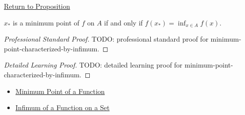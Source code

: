 \newpage
{}
\label{prf:minimum-point-characterized-by-infimum}

\begin{remark*}[Return]
\hyperref[prop:minimum-point-characterized-by-infimum]{Return to Proposition}
\end{remark*}

\begin{proposition*}
\(x_*\) is a minimum point of \(f\) on \(A\) if and only if \(f(x_*)=\inf_{x\in A}f(x)\).
\end{proposition*}

\begin{proof}[Professional Standard Proof]
\LRAProofBodyStart
TODO: professional standard proof for minimum-point-characterized-by-infimum.
\end{proof}

\begin{proof}[Detailed Learning Proof]
\LRAProofBodyStart
TODO: detailed learning proof for minimum-point-characterized-by-infimum.
\end{proof}

\begin{remark*}
\end{remark*}

\begin{dependencies}
\begin{itemize}
  \item \hyperref[def:function-minimum-point]{Minimum Point of a Function}
  \item \hyperref[def:function-infimum-on-set]{Infimum of a Function on a Set}
\end{itemize}
\end{dependencies}

\clearpage
